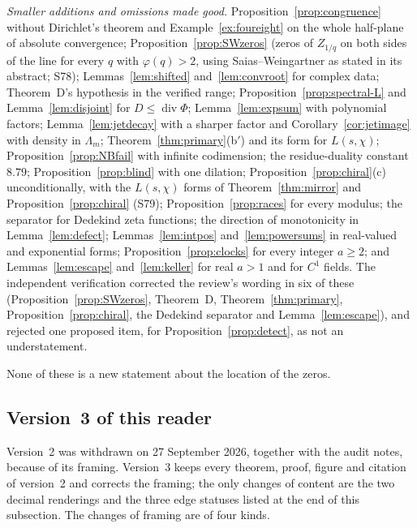 \emph{Smaller additions and omissions made good.} Proposition~\ref{prop:congruence} without Dirichlet's theorem and Example~\ref{ex:foureight} on the whole half-plane of absolute convergence; Proposition~\ref{prop:SWzeros} (zeros of $Z_{1/q}$ on both sides of the line for every $q$ with $\varphi(q)>2$, using Saias--Weingartner as stated in its abstract; S78); Lemmas~\ref{lem:shifted} and~\ref{lem:convroot} for complex data; Theorem~D's hypothesis in the verified range; Proposition~\ref{prop:spectral-L} and Lemma~\ref{lem:disjoint} for $D\le\operatorname{div}\Phi$; Lemma~\ref{lem:expsum} with polynomial factors; Lemma~\ref{lem:jetdecay} with a sharper factor and Corollary~\ref{cor:jetimage} with density in $\Lambda_m$; Theorem~\ref{thm:primary}(b$'$) and its form for $L(s,\chi)$; Proposition~\ref{prop:NBfail} with infinite codimension; the residue-duality constant $8.79$; Proposition~\ref{prop:blind} with one dilation; Proposition~\ref{prop:chiral}(c) unconditionally, with the $L(s,\chi)$ forms of Theorem~\ref{thm:mirror} and Proposition~\ref{prop:chiral} (S79); Proposition~\ref{prop:races} for every modulus; the separator for Dedekind zeta functions; the direction of monotonicity in Lemma~\ref{lem:defect}; Lemmas~\ref{lem:intpos} and~\ref{lem:powersums} in real-valued and exponential forms; Proposition~\ref{prop:clocks} for every integer $a\ge2$; and Lemmas~\ref{lem:escape} and~\ref{lem:keller} for real $a>1$ and for $C^1$ fields. The independent verification corrected the review's wording in six of these (Proposition~\ref{prop:SWzeros}, Theorem~D, Theorem~\ref{thm:primary}, Proposition~\ref{prop:chiral}, the Dedekind separator and Lemma~\ref{lem:escape}), and rejected one proposed item, for Proposition~\ref{prop:detect}, as not an understatement.

None of these is a new statement about the location of the zeros.


\subsection{Version~3 of this reader}

Version~2 was withdrawn on 27 September 2026, together with the audit notes, because of its framing. Version~3 keeps every theorem, proof, figure and citation of version~2 and corrects the framing; the only changes of content are the two decimal renderings and the three edge statuses listed at the end of this subsection. The changes of framing are of four kinds.


